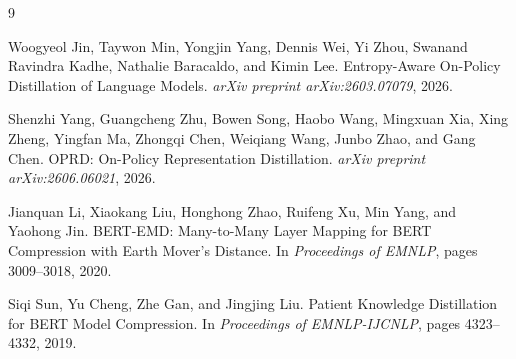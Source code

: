 \documentclass[10pt,twocolumn]{article}
\begin{document}
\begin{thebibliography}{9}

Woogyeol Jin, Taywon Min, Yongjin Yang, Dennis Wei, Yi Zhou, Swanand Ravindra Kadhe, Nathalie Baracaldo, and Kimin Lee.
\newblock Entropy-Aware On-Policy Distillation of Language Models.
\newblock \emph{arXiv preprint arXiv:2603.07079}, 2026.

Shenzhi Yang, Guangcheng Zhu, Bowen Song, Haobo Wang, Mingxuan Xia, Xing Zheng, Yingfan Ma, Zhongqi Chen, Weiqiang Wang, Junbo Zhao, and Gang Chen.
\newblock OPRD: On-Policy Representation Distillation.
\newblock \emph{arXiv preprint arXiv:2606.06021}, 2026.

Jianquan Li, Xiaokang Liu, Honghong Zhao, Ruifeng Xu, Min Yang, and Yaohong Jin.
\newblock BERT-EMD: Many-to-Many Layer Mapping for BERT Compression with Earth Mover's Distance.
\newblock In \emph{Proceedings of EMNLP}, pages 3009--3018, 2020.

Siqi Sun, Yu Cheng, Zhe Gan, and Jingjing Liu.
\newblock Patient Knowledge Distillation for BERT Model Compression.
\newblock In \emph{Proceedings of EMNLP-IJCNLP}, pages 4323--4332, 2019.

\end{thebibliography}
\end{document}
